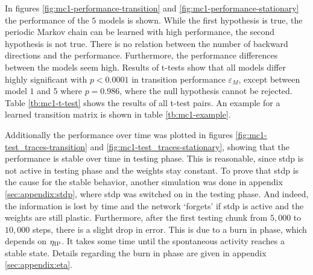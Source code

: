 In figures \ref{fig:mc1-performance-transition} and \ref{fig:mc1-performance-stationary} the performance of the $5$ models is shown. While the first hypothesis is true, the periodic Markov chain can be learned with high performance, the second hypothesis is not true. There is no relation between the number of backward directions and the performance. Furthermore, the performance differences between the models seem high. Results of t-tests show that all models differ highly significant with $p < 0.0001$ in transition performance $\varepsilon_M$, except between model $1$ and $5$ where $p=0.986$, where the null hypothesis cannot be rejected. Table \ref{tb:mc1-t-test} shows the results of all t-test pairs. An example for a learned transition matrix is shown in table \ref{tb:mc1-example}.

Additionally the performance over time was plotted in figures \ref{fig:mc1-test_traces-transition} and \ref{fig:mc1-test_traces-stationary}, showing that the performance is stable over time in testing phase. This is reasonable, since \acl{stdp} is not active in testing phase and the weights stay constant. To prove that \acs{stdp} is the cause for the stable behavior, another simulation was done in appendix \ref{sec:appendix:stdp}, where \acs{stdp} was switched on in the testing phase. And indeed, the information is lost by time and the network `forgets' if \acs{stdp} is active and the weights are still plastic. Furthermore, after the first testing chunk from $5,000$ to $10,000$ steps, there is a slight drop in error. This is due to a burn in phase, which depends on $\eta_{\text{IP}}$. It takes some time until the spontaneous activity reaches a stable state. Details regarding the burn in phase are given in appendix \ref{sec:appendix:eta}.

